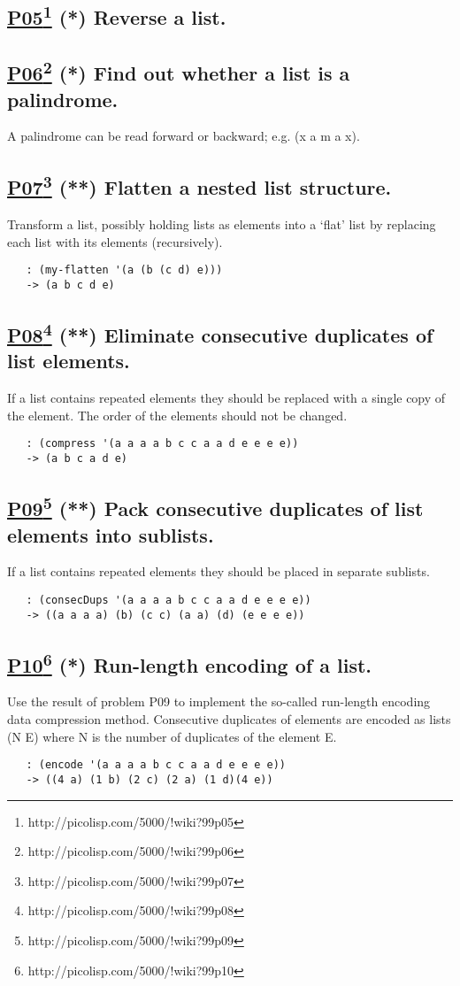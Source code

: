 \documentclass[10pt,a4paper]{article}
\begin{document}
\subsection*{\underline{P05}\footnote{http://picolisp.com/5000/!wiki?99p05} (*) Reverse a list.}

\subsection*{\underline{P06}\footnote{http://picolisp.com/5000/!wiki?99p06} (*) Find out whether a list is a palindrome.}
A palindrome can be read forward or backward; e.g. (x a m a x).

\subsection*{\underline{P07}\footnote{http://picolisp.com/5000/!wiki?99p07} (**) Flatten a nested list structure.}
Transform a list, possibly holding lists as elements into a `flat'
list by replacing each list with its elements (recursively).
\begin{verbatim}
   : (my-flatten '(a (b (c d) e)))
   -> (a b c d e)
\end{verbatim}


\subsection*{\underline{P08}\footnote{http://picolisp.com/5000/!wiki?99p08} (**) Eliminate consecutive duplicates of list elements.}
If a list contains repeated elements they should be replaced
with a single copy of the element. The order of the elements should
not be changed.
\begin{verbatim}
   : (compress '(a a a a b c c a a d e e e e))
   -> (a b c a d e)
\end{verbatim}


\subsection*{\underline{P09}\footnote{http://picolisp.com/5000/!wiki?99p09} (**) Pack consecutive duplicates of list elements into sublists.}
If a list contains repeated elements they should be placed in separate sublists.
\begin{verbatim}
   : (consecDups '(a a a a b c c a a d e e e e))
   -> ((a a a a) (b) (c c) (a a) (d) (e e e e))
\end{verbatim}


\subsection*{\underline{P10}\footnote{http://picolisp.com/5000/!wiki?99p10} (*) Run-length encoding of a list.}
Use the result of problem P09 to implement the so-called
run-length encoding data compression method. Consecutive duplicates
of elements are encoded as lists (N E) where N is the number
of duplicates of the element E.
\begin{verbatim}
   : (encode '(a a a a b c c a a d e e e e))
   -> ((4 a) (1 b) (2 c) (2 a) (1 d)(4 e))
\end{verbatim}
\end{document}
